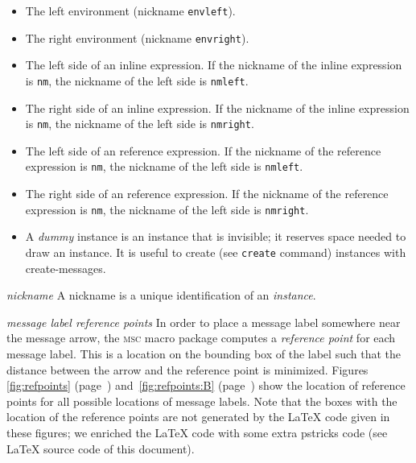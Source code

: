 \documentclass[a4paper]{article}
\newcommand{\acro}[1]{{\scshape\lowercase{#1}}}
\newcommand\MSC{\acro{MSC}}
\newcommand{\mscpack}{\MSC{} macro package}
\newenvironment{defs}{%
  \begin{list}{}%
              {\setlength{\labelwidth}{0pt}%
               \setlength{\labelsep}{1em}%
               \setlength{\leftmargin}{1em}%
               \setlength{\parsep}{1ex}%
               \setlength{\listparindent}{0pt}%
               \setlength{\rightmargin}{0pt}%
               \renewcommand{\makelabel}[1]{##1}%
               \raggedright%
              }%
  }{%
  \end{list}}
\begin{document}
\begin{defs}
\begin{itemize}

\item The left environment (nickname \verb|envleft|).

\item The right environment (nickname \verb|envright|).

\item The left side of an inline expression. If the nickname of the
inline expression is \verb|nm|, the nickname of the left side is
\verb|nmleft|.

\item The right side of an inline expression. If the nickname of the
inline expression is \verb|nm|, the nickname of the left side is
\verb|nmright|.

\item The left side of an reference expression. If the nickname of the
reference expression is \verb|nm|, the nickname of the left side is
\verb|nmleft|.

\item The right side of an reference expression. If the nickname of the
reference expression is \verb|nm|, the nickname of the left side is
\verb|nmright|.

\item A \emph{dummy} instance is an instance that is invisible; it
reserves space needed to draw an instance. It is useful to create
(see \verb|create| command) instances with create-messages.

\end{itemize}

\item[\emph{nickname}] A nickname is a unique identification of an
\emph{instance}.

\item[\emph{message label reference points}] In order to place a
message label somewhere near the message arrow, the \mscpack{}
computes a \emph{reference point} for each message label. This is a
location on the bounding box of the label such that the distance
between the arrow and the reference point is minimized. Figures
\ref{fig:refpoints} (page~\pageref{fig:refpoints})
and~\ref{fig:refpoints:B} (page~\pageref{fig:refpoints:B}) show the
location of reference points for all possible locations of message
labels. Note that the boxes with the location of the reference points
are not generated by the \LaTeX{} code given in these figures; we
enriched the \LaTeX{} code with some extra \textsf{pstricks} code (see
\LaTeX{} source code of this document).

\end{defs}
\end{document}
